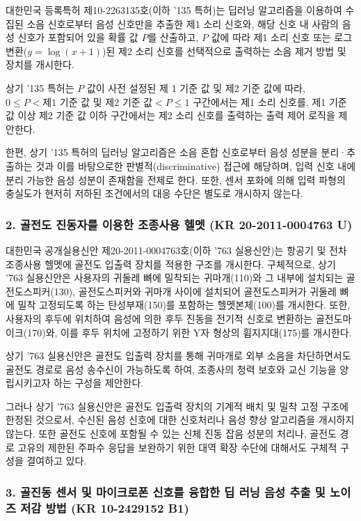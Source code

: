 \documentclass{article}
\begin{document}
대한민국 등록특허 제10-2263135호(이하 '135 특허)는 딥러닝 알고리즘을 이용하여 수집된 소음 신호로부터 음성 신호만을 추출한 제1 소리 신호와, 해당 신호 내 사람의 음성 신호가 포함되어 있을 확률 값 $P$를 산출하고, $P$ 값에 따라 제1 소리 신호 또는 로그 변환($y = \log(x + 1)$)된 제2 소리 신호를 선택적으로 출력하는 소음 제거 방법 및 장치를 개시한다.

상기 '135 특허는 $P$ 값이 사전 설정된 제 1 기준 값 및 제2 기준 값에 따라, $0 \le P < \text{제1 기준 값}$ 및 $\text{제2 기준 값} < P \le 1$ 구간에서는 제1 소리 신호를, 제1 기준 값 이상 제2 기준 값 이하 구간에서는 제2 소리 신호를 출력하는 출력 제어 로직을 제안한다.

한편, 상기 '135 특허의 딥러닝 알고리즘은 소음 혼합 신호로부터 음성 성분을 분리·추출하는 것과 이를 바탕으로한 판별적(discriminative) 접근에 해당하며, 입력 신호 내에 분리 가능한 음성 성분이 존재함을 전제로 한다. 
또한, 센서 포화에 의해 입력 파형의 충실도가 현저히 저하된 조건에서의 대응 수단은 별도로 개시하지 않는다.

\subsubsection*{2. 골전도 진동자를 이용한 조종사용 헬멧 (KR 20-2011-0004763 U)}

대한민국 공개실용신안 제20-2011-0004763호(이하 '763 실용신안)는 항공기 및 전차 조종사용 헬멧에 골전도 입출력 장치를 적용한 구조를 개시한다.
구체적으로, 상기 '763 실용신안은 사용자의 귀둘레 뼈에 밀착되는 귀마개(110)와 그 내부에 설치되는 골전도스피커(130), 골전도스피커와 귀마개 사이에 설치되어 골전도스피커가 귀둘레 뼈에 밀착 고정되도록 하는 탄성부재(150)를 포함하는 헬멧본체(100)를 개시한다.
또한, 사용자의 후두에 위치하여 음성에 의한 후두 진동을 전기적 신호로 변환하는 골전도마이크(170)와, 이를 후두 위치에 고정하기 위한 Y자 형상의 휨지지대(175)를 개시한다.

상기 '763 실용신안은 골전도 입출력 장치를 통해 귀마개로 외부 소음을 차단하면서도 골전도 경로로 음성 송수신이 가능하도록 하여, 조종사의 청력 보호와 교신 기능을 양립시키고자 하는 구성을 제안한다.

그러나 상기 '763 실용신안은 골전도 입출력 장치의 기계적 배치 및 밀착 고정 구조에 한정된 것으로서, 수신된 음성 신호에 대한 신호처리나 음성 향상 알고리즘을 개시하지 않는다. 또한 골전도 신호에 포함될 수 있는 신체 진동 잡음 성분의 처리나, 골전도 경로 고유의 제한된 주파수 응답을 보완하기 위한 대역 확장 수단에 대해서도 구체적 구성을 결여하고 있다.



\subsubsection*{3. 골진동 센서 및 마이크로폰 신호를 융합한 딥 러닝 음성 추출 및 노이즈 저감 방법 (KR 10-2429152 B1)}
\end{document}
